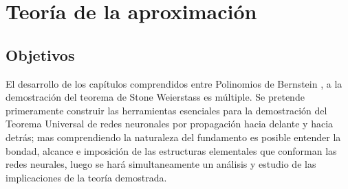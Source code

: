 
\chapter{Teoría de la aproximación}
\section{Objetivos}  

El desarrollo de los capítulos comprendidos entre Polinomios de Bernstein , 
a la demostración del teorema de Stone Weierstass  es múltiple.
Se pretende primeramente construir las herramientas esenciales para la demostración del 
Teorema Universal de redes neuronales por propagación hacia delante y hacia detrás; 
mas comprendiendo la naturaleza del fundamento es posible entender la bondad, alcance e imposición
de las estructuras elementales que conforman las redes neurales, luego se hará simultaneamente
un análisis y estudio de las implicaciones de la teoría demostrada. 




